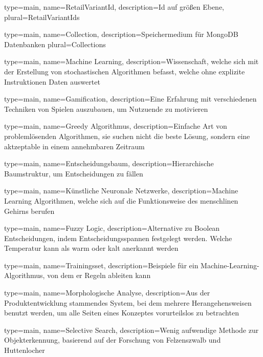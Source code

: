 

{
	type=main,
    name=RetailVariantId,
    description={Id auf größen Ebene},
    plural={RetailVariantIds}
}

{
	type=main,
    name=Collection,
    description={Speichermedium für MongoDB Datenbanken}
    plural={Collections}
}


{
	type=main,
    name=Machine Learning,
    description={Wissenschaft, welche sich mit der Erstellung von stochastischen Algorithmen befasst, welche ohne explizite Instruktionen Daten auswertet}
}

{
	type=main,
    name=Gamification,
    description={Eine Erfahrung mit verschiedenen Techniken von Spielen auszubauen, um Nutzuende zu motivieren}
}

{
	type=main,
    name=Greedy Algorithmus,
    description={Einfache Art von problemlösenden Algorithmen, sie suchen nicht die beste Lösung, sondern eine aktzeptable in einem annehmbaren Zeitraum}
}

{
	type=main,
    name=Entscheidungsbaum,
    description={Hierarchische Baumstruktur, um Entscheidungen zu fällen}
}

{
	type=main,
    name=Künstliche Neuronale Netzwerke,
    description={Machine Learning Algorithmen, welche sich auf die Funktionsweise des menschlinen Gehirns berufen}
}

{
	type=main,
    name=Fuzzy Logic,
    description={Alternative zu Boolean Entscheidungen, indem Entscheidungsspannen festgelegt werden. Welche Temperatur kann als warm oder kalt anerkannt werden}
}

{
	type=main,
    name=Trainingsset,
    description={Beispiele für ein Machine-Learning-Algorithmus, von dem er Regeln ableiten kann}
}

{
	type=main,
    name=Morphologische Analyse,
    description={Aus der Produktentwicklung stammendes System, bei dem mehrere Herangehensweisen benutzt werden, um alle Seiten eines Konzeptes vorurteilslos zu betrachten}
}

{
	type=main,
    name=Selective Search,
    description={Wenig aufwendige Methode zur Objekterkennung, basierend auf der Forschung von Felzenszwalb und Huttenlocher}
}